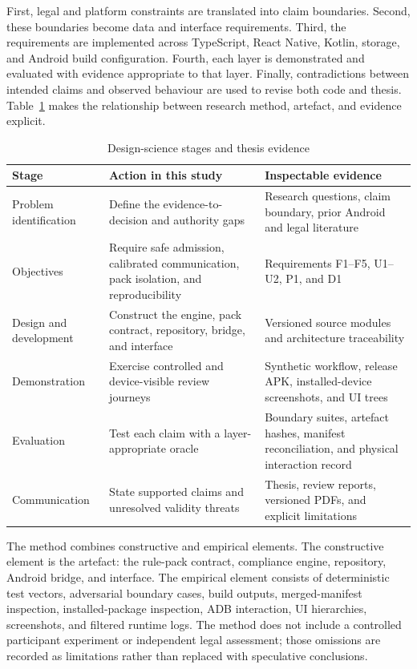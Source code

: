 First, legal and platform constraints are translated into claim boundaries. Second, these boundaries become data and interface requirements. Third, the requirements are implemented across TypeScript, React Native, Kotlin, storage, and Android build configuration. Fourth, each layer is demonstrated and evaluated with evidence appropriate to that layer. Finally, contradictions between intended claims and observed behaviour are used to revise both code and thesis. Table~\ref{tab:dsr-method-map} makes the relationship between research method, artefact, and evidence explicit.

\begin{table}[H]
\centering
\caption{Design-science stages and thesis evidence}
\label{tab:dsr-method-map}
\small
\begin{tabular}{>{\raggedright\arraybackslash}p{}>{\raggedright\arraybackslash}p{}>{\raggedright\arraybackslash}p{}}
\toprule
Stage & Action in this study & Inspectable evidence \\
\midrule
Problem identification & Define the evidence-to-decision and authority gaps & Research questions, claim boundary, prior Android and legal literature \\
Objectives & Require safe admission, calibrated communication, pack isolation, and reproducibility & Requirements F1--F5, U1--U2, P1, and D1 \\
Design and development & Construct the engine, pack contract, repository, bridge, and interface & Versioned source modules and architecture traceability \\
Demonstration & Exercise controlled and device-visible review journeys & Synthetic workflow, release APK, installed-device screenshots, and UI trees \\
Evaluation & Test each claim with a layer-appropriate oracle & Boundary suites, artefact hashes, manifest reconciliation, and physical interaction record \\
Communication & State supported claims and unresolved validity threats & Thesis, review reports, versioned PDFs, and explicit limitations \\
\bottomrule
\end{tabular}
\end{table}

The method combines constructive and empirical elements. The constructive element is the artefact: the rule-pack contract, compliance engine, repository, Android bridge, and interface. The empirical element consists of deterministic test vectors, adversarial boundary cases, build outputs, merged-manifest inspection, installed-package inspection, ADB interaction, UI hierarchies, screenshots, and filtered runtime logs. The method does not include a controlled participant experiment or independent legal assessment; those omissions are recorded as limitations rather than replaced with speculative conclusions.

